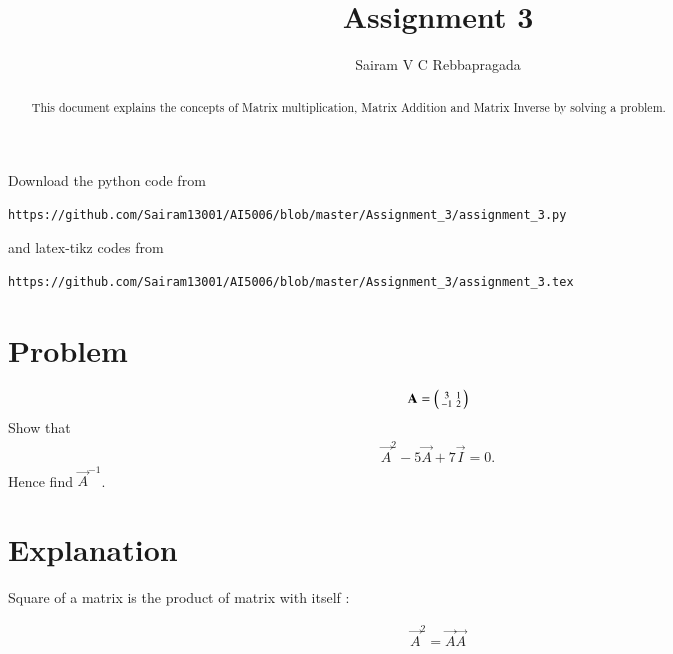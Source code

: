 \documentclass[journal,12pt,twocolumn]{IEEEtran}
\begin{document}
\renewcommand{\thefigure}{\theproblem}
\def\putbox#1#2#3{\makebox[0in][l]{\makebox[#1][l]{}\raisebox{\baselineskip}[0in][0in]{\raisebox{#2}[0in][0in]{#3}}}}
     \def\rightbox#1{\makebox[0in][r]{#1}}
     \def\centbox#1{\makebox[0in]{#1}}
     \def\topbox#1{\raisebox{-\baselineskip}[0in][0in]{#1}}
     \def\midbox#1{\raisebox{-0.5\baselineskip}[0in][0in]{#1}}
\vspace{3cm}
\title{Assignment 3}
\author{Sairam V C Rebbapragada}
\maketitle
\newpage
\bigskip
\renewcommand{\thefigure}{\theenumi}
\renewcommand{\thetable}{\theenumi}
\begin{abstract}
This document explains the concepts of Matrix multiplication, Matrix Addition and Matrix Inverse by solving a problem.
\end{abstract}
Download the python code from 
%
\begin{lstlisting}
https://github.com/Sairam13001/AI5006/blob/master/Assignment_3/assignment_3.py
\end{lstlisting}
%
and latex-tikz codes from 
%
\begin{lstlisting}
https://github.com/Sairam13001/AI5006/blob/master/Assignment_3/assignment_3.tex
\end{lstlisting}
%
\section{Problem}
\begin{align}
   \mathbf{A}  = \begin{psmallmatrix} 3 & 1\\ -1 & 2\end{psmallmatrix}     
\end{align}
Show that 
\begin{align}
\vec{A}^2 - 5\vec{A} + 7\vec{I} = 0.     
\end{align}
Hence find $\vec{A}^{-1}$.


\section{Explanation}

Square of a matrix is the product of matrix with itself :

\begin{align}
\vec{A}^2 = \vec{A}\vec{A}
\end{align}
\end{document}
